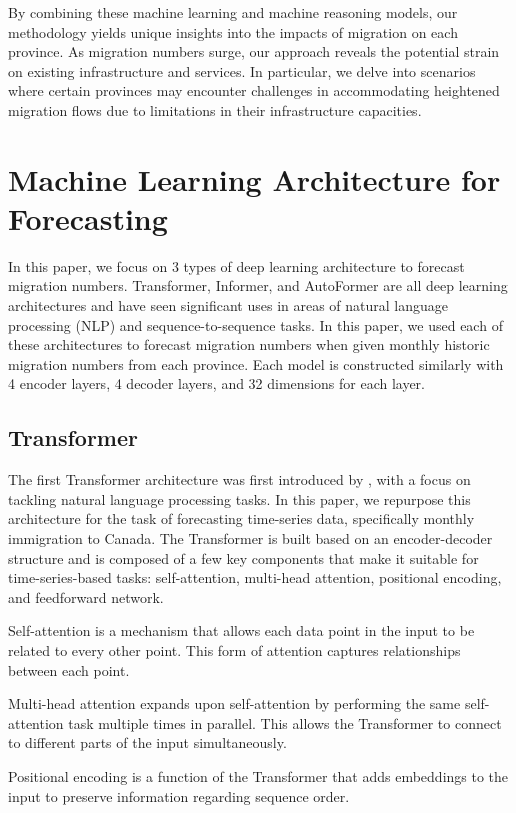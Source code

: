 \documentclass[conference]{IEEEtran}
\begin{document}
	By combining these machine learning and machine reasoning models, our methodology yields unique insights into the impacts of migration on each province. As migration numbers surge, our approach reveals the potential strain on existing infrastructure and services. In particular, we delve into scenarios where certain provinces may encounter challenges in accommodating heightened migration flows due to limitations in their infrastructure capacities.
	
	\section{Machine Learning Architecture for Forecasting}
	
	In this paper, we focus on 3 types of deep learning architecture to forecast migration numbers.  Transformer, Informer, and AutoFormer are all deep learning architectures and have seen significant uses in areas of natural language processing (NLP) and sequence-to-sequence tasks. In this paper, we used each of these architectures to forecast migration numbers when given monthly historic migration numbers from each province.  Each model is constructed similarly with 4 encoder layers, 4 decoder layers, and 32 dimensions for each layer.
	
	\subsection{Transformer}
	The first Transformer architecture was first introduced by \cite{vaswani2017attention}, with a focus on tackling natural language processing tasks.  In this paper, we repurpose this architecture for the task of forecasting time-series data, specifically monthly immigration to Canada.  The Transformer is built based on an encoder-decoder structure and is composed of a few key components that make it suitable for time-series-based tasks: self-attention, multi-head attention, positional encoding, and feedforward network.
	
	Self-attention is a mechanism that allows each data point in the input to be related to every other point.  This form of attention captures relationships between each point.
	
	Multi-head attention expands upon self-attention by performing the same self-attention task multiple times in parallel.  This allows the Transformer to connect to different parts of the input simultaneously.
	
	Positional encoding is a function of the Transformer that adds embeddings to the input to preserve information regarding sequence order.
	
\end{document}
